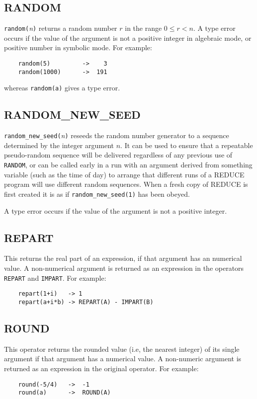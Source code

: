 \subsection{RANDOM}

{\tt random(}{\em n\/}{\tt)} returns a random number $r$ in the range $0
\leq r < n$.  A type error occurs if the value of the argument is not a
positive integer in algebraic mode, or positive number in symbolic mode.
For example:
\begin{verbatim}
	random(5)         ->    3
	random(1000)      ->  191
\end{verbatim}
whereas {\tt random(a)} gives a type error.

\subsection{RANDOM\_NEW\_SEED}

{\tt random\_new\_seed(}{\em n\/}{\tt)} reseeds the random number generator
to a sequence determined by the integer argument $n$.  It can be used to
ensure that a repeatable pseudo-random sequence will be delivered
regardless of any previous use of {\tt RANDOM}, or can be called early in
a run with an argument derived from something variable (such as the time
of day) to arrange that different runs of a REDUCE program will use
different random sequences.  When a fresh copy of REDUCE is first created
it is as if {\tt random\_new\_seed(1)} has been obeyed.

A type error occurs if the value of the argument is not a positive integer.

\subsection{REPART}
This returns the real part of an expression, if that argument has an
numerical value.  A non-numerical argument is returned as an expression in
the operators {\tt REPART} and {\tt IMPART}.  For example:
\begin{verbatim}
	repart(1+i)   -> 1
	repart(a+i*b) -> REPART(A) - IMPART(B)
\end{verbatim}

\subsection{ROUND}
This operator returns the rounded value (i.e, the nearest integer) of its
single argument if that argument has a numerical value.  A non-numeric
argument is returned as an expression in the original operator.  For
example:
\begin{verbatim}
	round(-5/4)   ->  -1
	round(a)      ->  ROUND(A)
\end{verbatim}

